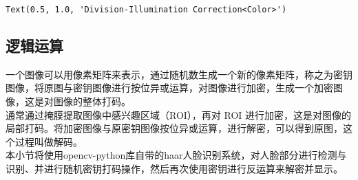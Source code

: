 \documentclass[11pt]{article}
\makeatletter
\newcommand{\boxspacing}{\kern\kvtcb@left@rule\kern\kvtcb@boxsep}
\newcommand{\prompt}[4]{
        {\ttfamily\llap{{\color{#2}[#3]:\hspace{3pt}#4}}\vspace{-\baselineskip}}
    }
\makeatother
\begin{document}
            \begin{tcolorbox}[breakable, size=fbox, boxrule=.5pt, pad at break*=1mm, opacityfill=0]
\begin{Verbatim}[commandchars=\\\{\}]
Text(0.5, 1.0, 'Division-Illumination Correction<Color>')
\end{Verbatim}
\end{tcolorbox}
        
    \begin{center}
    \end{center}
    
    \subsection{逻辑运算}
    一个图像可以用像素矩阵来表示，通过随机数生成一个新的像素矩阵，称之为密钥图像，将原图与密钥图像进行按位异或运算，对图像进行加密，生成一个加密图像，这是对图像的整体打码。\\
    通常通过掩膜提取图像中感兴趣区域（ROI），再对 ROI 进行加密，这是对图像的局部打码。将加密图像与原密钥图像按位异或运算，进行解密，可以得到原图，这个过程叫做解码。\\
    本小节将使用opencv-python库自带的haar人脸识别系统，对人脸部分进行检测与识别、并进行随机密钥打码操作，然后再次使用密钥进行反运算来解密并显示。
\end{document}
